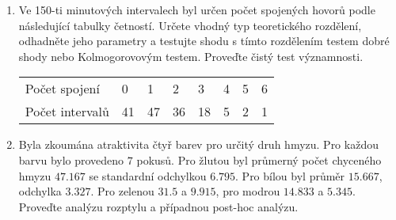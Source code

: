 \documentclass[a4paper,12pt]{article}
\begin{document}
\begin{enumerate}
  \item Ve 150-ti minutových intervalech byl určen počet spojených hovorů podle následující tabulky četností.
        Určete vhodný typ teoretického rozdělení, odhadněte jeho parametry a testujte shodu s tímto rozdělením 
        testem dobré shody nebo Kolmogorovovým testem. Proveďte čistý test významnosti.
    \begin{center}
    \begin{tabular}{llllllll}
    Počet spojení           &0& 1& 2& 3& 4& 5& 6\\
    Počet intervalů     &41& 47& 36& 18& 5& 2& 1
    \end{tabular}
    \end{center}

    
    
    
    \item Byla zkoumána atraktivita čtyř barev pro určitý druh hmyzu. Pro každou barvu bylo provedeno $7$ pokusů.
    Pro žlutou byl průmerný počet chyceného hmyzu $47.167$ se standardní odchylkou $6.795$. Pro bílou byl průměr 
    $15.667$, odchylka $3.327$. Pro zelenou $31.5$ a $9.915$, pro modrou $14.833$ a $5.345$. Proveďte analýzu rozptylu 
    a případnou post-hoc analýzu.

\end{enumerate}
\end{document}
